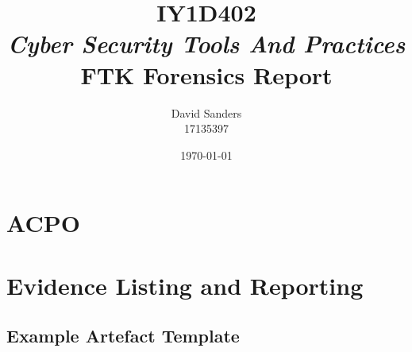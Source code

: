\documentclass[12pt]{article}
\title{IY1D402{\textit{\small \\Cyber Security Tools And Practices}}\\FTK Forensics Report}
\author{David Sanders\\{\LARGE 17135397}}
\date{\today}
\begin{document}
\maketitle
\pagebreak
\tableofcontents

\pagebreak
\section{ACPO}
\pagebreak
\section{Evidence Listing and Reporting}
\subsection{Example Artefact Template}
\end{document}
